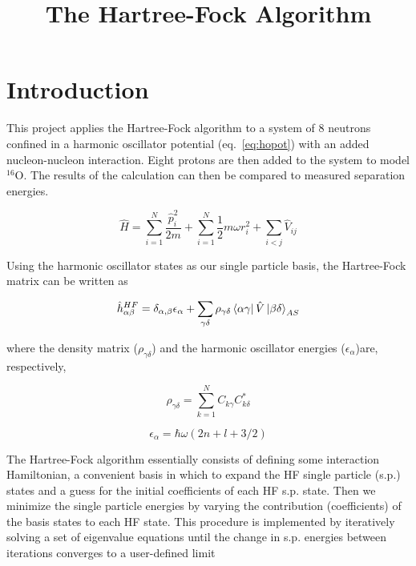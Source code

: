 \documentclass[]{scrartcl}
\title{The Hartree-Fock Algorithm}
\newcommand{\oxygen}[1]{%
	\ensuremath{ ^{#1} \mathrm{O} }}
\begin{document}

\maketitle

\section*{Introduction}

This project applies the Hartree-Fock algorithm to a system of 8 neutrons confined in a harmonic oscillator potential (eq.~\ref{eq:hopot}) with an added nucleon-nucleon interaction. Eight protons are then added to the system to model \oxygen{16}. The results of the calculation can then be compared to measured separation energies.

\begin{equation}
	\hat{H} = \sum_{i=1}^{N} \frac{\hat{p} _i ^2}{2m} + \sum_{i=1}^{N} \frac{1}{2} m \omega r _i ^2 + \sum_{i<j} \hat{V} _{ij}
	\label{eq:hopot}
\end{equation}

\noindent Using the harmonic oscillator states as our single particle basis, the Hartree-Fock matrix can be written as

\begin{equation}
	\hat{h} ^{HF} _{\alpha \beta} = \delta _{\alpha, \beta} \epsilon _{\alpha} + \sum_{\gamma \delta} \rho _{\gamma \delta} \bra{\alpha \gamma} \hat{V} \ket{ \beta \delta} _{AS}
	\label{eq:hfmtx}
\end{equation}

\noindent where the density matrix ($\rho _{\gamma \delta}$) and the harmonic oscillator energies ($\epsilon _{\alpha}$)are, respectively,

\begin{equation}
	\rho _{\gamma \delta} = \sum_{k=1}^{N} C _{k \gamma} C^{*} _{k \delta}
	\label{eq:hfrho}
\end{equation}

\begin{equation}
	\epsilon _{\alpha} = \hbar \omega ( 2n + l + 3/2)
	\label{eq:hospe}
\end{equation}

\noindent The Hartree-Fock algorithm essentially consists of defining some interaction Hamiltonian, a convenient basis in which to expand the HF single particle (s.p.) states and a guess for the initial coefficients of each HF s.p. state. Then we minimize the single particle energies by varying the contribution (coefficients) of the basis states to each HF state. This procedure is implemented by iteratively solving a set of eigenvalue equations until the change in s.p. energies between iterations converges to a user-defined limit
\end{document}
